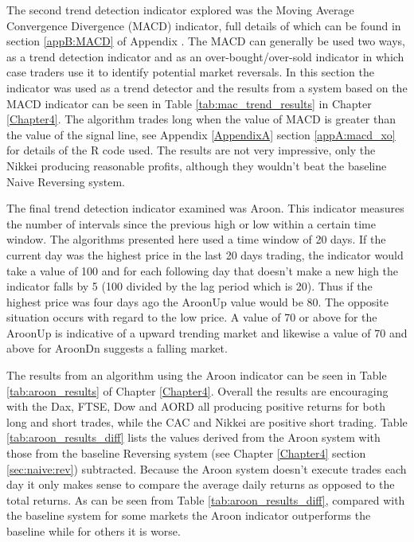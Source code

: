 The second trend detection indicator explored was the Moving Average Convergence Divergence (MACD) indicator, full details of which can be found in section \ref{appB:MACD} of Appendix \label{AppendixB}. The MACD can generally be used two ways, as a trend detection indicator and as an over-bought/over-sold indicator in which case traders use it to identify potential market reversals. In this section the indicator was used as a trend detector and the results from a system based on the MACD indicator can be seen in Table \ref{tab:mac_trend_results} in Chapter \ref{Chapter4}.  The algorithm trades long when the value of MACD is greater than the value of the signal line, see Appendix \ref{AppendixA} section \ref{appA:macd_xo} for details of the R code used. The results are not very impressive, only the Nikkei producing reasonable profits, although they wouldn't beat the baseline Naive Reversing system.

The final trend detection indicator examined was Aroon.  This indicator measures the number of intervals since the previous high or low within a certain time window. The algorithms presented here used a time window of 20 days. If the current day was the highest price in the last 20 days trading, the indicator would take a value of 100 and for each following day that doesn't make a new high the indicator falls by 5 (100 divided by the lag period which is 20).  Thus if the highest price was four days ago the AroonUp value would be 80. The opposite situation occurs with regard to the low price. A value of 70 or above for the AroonUp is indicative of a upward trending market and likewise a value of 70 and above for AroonDn suggests a falling market.

The results from an algorithm using the Aroon indicator can be seen in Table \ref{tab:aroon_results} of Chapter \ref{Chapter4}. Overall the results are encouraging with the Dax, FTSE, Dow and AORD all producing positive returns for both long and short trades, while the CAC and Nikkei are positive short trading. Table \ref{tab:aroon_results_diff} lists the values derived from the Aroon system with those from the baseline Reversing system (see Chapter \ref{Chapter4} section \ref{sec:naive:rev}) subtracted. Because the Aroon system doesn't execute trades each day it only makes sense to compare the average daily returns as opposed to the total returns. As can be seen from  Table \ref{tab:aroon_results_diff}, compared with the baseline system for some markets the Aroon indicator outperforms the baseline while for others it is worse. 

